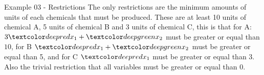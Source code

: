\begin{frame}{Example 03 - Restrictions}
The only restrictions are the minimum amounts of units of each chemicals
that must be produced. These are at least 10 units of chemical A, 5 units
of chemical B and 3 units of chemical C, this is that for A:
$3\colora{x_1} + \colorb{x_2}$ must be greater or equal than $10$, for B $\colora{x_1} + \colorb{x_2} $
must be greater or equal than 5, and for C $\colora{x_1}$ must be greater or equal than 3.
 Also the trivial restriction that all variables must be greater or equal than 0.
\end{frame}
